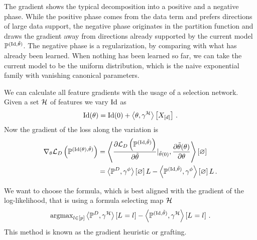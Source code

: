 The gradient shows the typical decomposition into a positive and a negative phase.
While the positive phase comes from the data term and prefers directions of large data support, the negative phase originates in the partition function and draws the gradient away from directions already supported by the current model $\mathbb{P}^{(\mathrm{Id}, \tilde{\theta})}$.
The negative phase is a regularization, by comparing with what has already been learned.
When nothing has been learned so far, we can take the current model to be the uniform distribution, which is the naive exponential family with vanishing canonical parameters. 



We can calculate all feature gradients with the usage of a selection network.
Given a set $\mathcal{H}$ of features we vary $\mathrm{Id}$ as
\begin{align*}
	 \naivestat(\canparam) %
	= \naivestat(0) + \sbcontractionof{\canparam,\sencodingof{\fselectionmap}}{\shortcatvariables} \, . 
\end{align*}
Now the gradient of the loss along the variation is
\begin{align*}
	 \nabla_{\theta} \mathcal{L}_{D}\left(\mathbb{P}^{(\mathrm{Id}(\theta), \tilde{\theta})}\right)
	 &= \left\langle 
	 	\frac{\partial\mathcal{L}_{D}\left(\mathbb{P}^{(\mathrm{Id}, \tilde{\theta})}\right)}{\partial\tilde{\theta}}|_{\tilde{\theta}(0)},
		\frac{\partial\tilde{\theta}(\theta)}{\partial\theta} 
	 \right\rangle \left[ \varnothing \right]  \\
	 &= \left\langle \mathbb{P}^{D},\gamma^{\phi}\right\rangle \left[ \varnothing \right]{L} -   \left\langle \mathbb{P}^{(\mathrm{Id}, \tilde{\theta})},\gamma^{\phi}\right\rangle \left[ \varnothing \right]{L} \, . 
\end{align*}



We want to choose the formula, which is best aligned with the gradient of the log-likelihood, that is using a formula selecting map $\mathcal{H}$
\begin{align*}
	\mathrm{argmax}_{l\in[p]} \left\langle \mathbb{P}^{D},\gamma^{\mathcal{H}}\right\rangle \left[ L_{}=l_{} \right] - \left\langle \mathbb{P}^{(\mathrm{Id}, \tilde{\theta})},\gamma^{\mathcal{H}}\right\rangle \left[ L_{}=l_{} \right] \, . 
\end{align*}
This method is known as the gradient heuristic or grafting.


